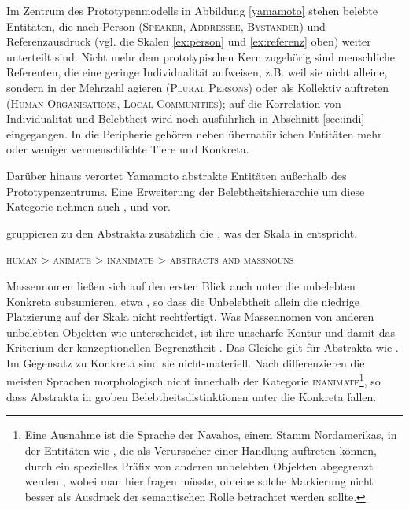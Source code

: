 Im Zentrum des Prototypenmodells in Abbildung \ref{yamamoto} stehen belebte Entitäten, die nach Person (\textsc{Speaker, Addressee, Bystander}) und Referenzausdruck (vgl. die Skalen \ref{ex:person}  und \ref{ex:referenz} oben) weiter unterteilt sind. Nicht mehr dem prototypischen Kern zugehörig sind menschliche Referenten, die eine geringe Individualität aufweisen, z.B. weil sie nicht alleine, sondern in der Mehrzahl agieren (\textsc{Plural Persons}) oder als Kollektiv auftreten (\textsc{Human Organisations, Local Communities}); auf die Korrelation von Individualität und Belebtheit wird noch ausführlich in Abschnitt \ref{sec:indi} eingegangen. In die Peripherie gehören neben übernatürlichen Entitäten mehr oder weniger vermenschlichte Tiere und Konkreta.  

Darüber hinaus verortet Yamamoto abstrakte Entitäten außerhalb des Prototypenzentrums. Eine Erweiterung der Belebtheitshierarchie um diese Kategorie nehmen auch \textcite{Allan1987} \textcite{Langacker1991}, und \textcite{Croft1995} vor. 

\textcite[194]{Enger2011} gruppieren zu den Abstrakta zusätzlich die , was der Skala in  entspricht. 

\begin{exe}
	\ex \label{ex:einfachbelebt} \textsc{human > animate > inanimate  > abstracts and massnouns}
	\end{exe}
\noindent
Massennomen ließen sich auf den ersten Blick auch unter die unbelebten Konkreta subsumieren, etwa , so dass die Unbelebtheit allein die niedrige Platzierung auf der Skala nicht rechtfertigt. Was Massennomen von anderen unbelebten Objekten wie  unterscheidet, ist ihre unscharfe Kontur und damit das Kriterium der konzeptionellen Begrenztheit \parencite[203--207]{Langacker1987}. Das Gleiche gilt für Abstrakta wie . Im Gegensatz zu Konkreta sind sie nicht-materiell. Nach \textcite[197]{Comrie1989} differenzieren die meisten Sprachen morphologisch nicht innerhalb der Kategorie \textsc{inanimate}\footnote{Eine Ausnahme ist die Sprache der Navahos, einem Stamm Nordamerikas, in der Entitäten wie , die als Verursacher einer Handlung auftreten können, durch ein spezielles Präfix von anderen unbelebten Objekten abgegrenzt  werden \parencite[197]{Comrie1989}, wobei man hier fragen müsste, ob eine solche Markierung nicht besser als Ausdruck der semantischen Rolle  \parencite[73]{Primus2012} betrachtet werden sollte.}, so dass Abstrakta in groben Belebtheitsdistinktionen unter die Konkreta fallen.

